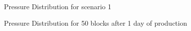 \documentclass[12pt,letterpaper,titlepage]{article}
\begin{document}
\begin{figure}[p]
\centering
{}
\caption{\label{fig:3}Pressure Distribution for scenario 1}
\end{figure}
\begin{figure}[p]
\centering
{}
\caption{\label{fig:50n}Pressure Distribution for 50 blocks after 1 day of production}
\end{figure}
\end{document}

